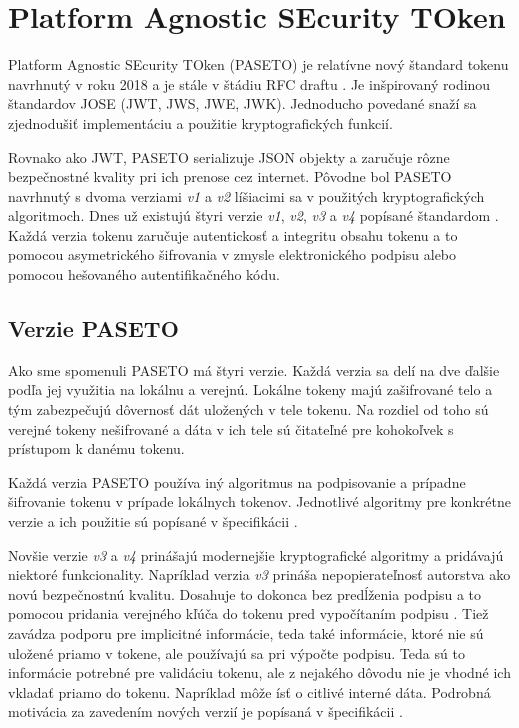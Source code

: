 \section{Platform Agnostic SEcurity TOken}

Platform Agnostic SEcurity TOken (PASETO) je relatívne nový štandard tokenu navrhnutý v roku 2018 a je stále v štádiu RFC draftu \cite{paseto_rfc}. Je inšpirovaný rodinou štandardov JOSE (JWT, JWS, JWE, JWK). Jednoducho povedané snaží sa zjednodušiť implementáciu a použitie kryptografických funkcií.

Rovnako ako JWT, PASETO serializuje JSON objekty a zaručuje rôzne bezpečnostné kvality pri ich prenose cez internet. Pôvodne bol PASETO navrhnutý s dvoma verziami \textit{v1} a \textit{v2} líšiacimi sa v použitých kryptografických algoritmoch. Dnes už existujú štyri verzie \textit{v1}, \textit{v2}, \textit{v3} a \textit{v4} popísané štandardom \cite{paseto_git}. Každá verzia tokenu zaručuje autentickosť a integritu obsahu tokenu a to pomocou asymetrického šifrovania v zmysle elektronického podpisu alebo pomocou hešovaného autentifikačného kódu.

\subsection{Verzie PASETO}

Ako sme spomenuli PASETO má štyri verzie. Každá verzia sa delí na dve ďalšie podľa jej využitia na lokálnu a verejnú. Lokálne tokeny majú zašifrované telo a tým zabezpečujú dôvernosť dát uložených v tele tokenu. Na rozdiel od toho sú verejné tokeny nešifrované a dáta v ich tele sú čitateľné pre kohokoľvek s prístupom k danému tokenu.

Každá verzia PASETO používa iný algoritmus na podpisovanie a prípadne šifrovanie tokenu v prípade lokálnych tokenov. Jednotlivé algoritmy pre konkrétne verzie a ich použitie sú popísané v špecifikácii \cite{paseto_git}.

Novšie verzie \textit{v3} a \textit{v4} prinášajú modernejšie kryptografické algoritmy a pridávajú niektoré funkcionality. Napríklad verzia \textit{v3} prináša nepopierateľnosť autorstva ako novú bezpečnostnú kvalitu. Dosahuje to dokonca bez predĺženia podpisu a to pomocou pridania verejného kľúča do tokenu pred vypočítaním podpisu \cite{ueo}. Tiež zavádza podporu pre implicitné informácie, teda také informácie, ktoré nie sú uložené priamo v tokene, ale používajú sa pri výpočte podpisu. Teda sú to informácie potrebné pre validáciu tokenu, ale z nejakého dôvodu nie je vhodné ich vkladať priamo do tokenu. Napríklad môže ísť o citlivé interné dáta. Podrobná motivácia za zavedením nových verzií je popísaná v špecifikácii \cite{paseto_git}.

